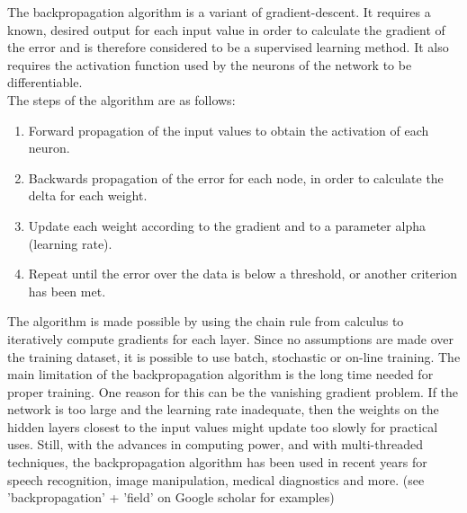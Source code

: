 \documentclass[12pt,oneside]{CUNY_CS_PhD}
\begin{document}
The backpropagation algorithm is a variant of gradient-descent. It requires a known, desired output for each input value in order to calculate the gradient of the error and is therefore considered to be a supervised learning method. It also requires the activation function used by the neurons of the network to be differentiable.\\
The steps of the algorithm are as follows:
\begin{enumerate}
\item Forward propagation of the input values to obtain the activation of each neuron.
\item Backwards propagation of the error for each node, in order to calculate the delta for each weight.
\item Update each weight according to the gradient and to a parameter alpha (learning rate).
\item Repeat until the error over the data is below a threshold, or another criterion has been met.
\end{enumerate}
The algorithm is made possible by using the chain rule from calculus to iteratively compute gradients for each layer. Since no assumptions are made over the training dataset, it is possible to use batch, stochastic or on-line training. The main limitation of the backpropagation algorithm is the long time needed for proper training. One reason for this can be the vanishing gradient problem. If the network is too large and the learning rate inadequate, then the weights on the hidden layers closest to the input values might update too slowly for practical uses. Still, with the advances in computing power, and with multi-threaded techniques, the backpropagation algorithm has been used in recent years for speech recognition, image manipulation, medical diagnostics and more.
(see 'backpropagation' + 'field' on Google scholar for examples)
\end{document}
